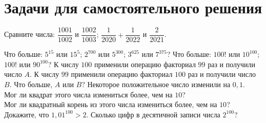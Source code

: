 \documentclass[a4paper,12pt]{article}
\begin{document}
    \newrules
    
    \section{Задачи для самостоятельного решения}
    
    \problem Сравните числа: \sub $\dfrac{1001}{1002}$ и $\dfrac{1002}{1003}$; \sub $\dfrac{1}{2020} + \dfrac{1}{2022}$ и $\dfrac{2}{2021}$.
    \vspace{2mm}
    
    \problem Что больше: \sub $5^{15}$ или $15^5$; \sub $2^{700}$ или $5^{300}$; \sub $3^{625}$ или $7^{375}$?
    \problem Что больше: \sub $100!$ или $10^{100}$; \sub $100!$ или $90^{100}$?
    \problem К числу $100$ применили операцию факториал $99$ раз и получили число $A$. К числу $99$ применили операцию факториал $100$ раз и получили число $B$. Что больше, $A$ или $B$?
    \problem Некоторое положительное число изменили на $0,1$. \\
    \sub Мог ли квадрат этого числа измениться более, чем на $10$? \\
    \sub Мог ли квадратный корень из этого числа измениться более, чем на $10$?
    \problem Докажите, что $1,01^{100} > 2$.
    \problem Сколько цифр в десятичной записи числа $2^{100}$?
\end{document}
